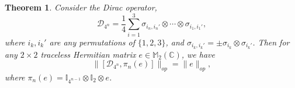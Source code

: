 \documentclass[a4paper,12pt]{article}
\newtheorem{theorem}{Theorem}
\begin{document}
\begin{theorem}
  Consider the Dirac operator,
  \begin{equation}
    \mathcal{D}_{4^n} = \frac{1}{4}  \sum_{i = 1}^3 \sigma_{i_n, i_n'}
    \otimes \cdots \otimes \sigma_{i_1, i_1'},
  \end{equation}
  where $i_k, i_k'$ are any permutations of $\{1, 2, 3\}$, and $\sigma_{i_k,
  i_k'} = \pm \sigma_{i_k} \otimes \sigma_{i_k'}$. Then for any $2 \times 2$
  traceless Hermitian matrix $e \in \mathbb{M}_2 (\mathbb{C})$, we have
  \begin{equation}
    \|[\mathcal{D}_{4^n}, \pi_n (e)]\|_{op} = \|e\|_{op},
  \end{equation}
  where $\pi_n (e) =\mathbb{I}_{4^{n - 1}} \otimes \mathbb{I}_2 \otimes e$.
\end{theorem}
\end{document}
